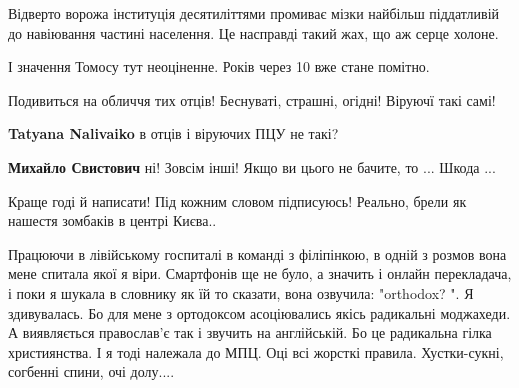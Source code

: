 \begin{itemize}
Відверто ворожа інституція десятиліттями промиває мізки найбільш піддатливій до
навіювання частині населення. Це насправді такий жах, що аж серце холоне.

І значення Томосу тут неоціненне. Років через 10 вже стане помітно.


 

Подивиться на обличчя тих отців!
Беснуваті, страшні, огідні!
Віруючї такі самі!

\begin{itemize}
 
\textbf{Tatyana Nalivaiko} в отців і віруючих ПЦУ не такі?

 
\textbf{Михайло Свистович} ні! Зовсім інші!
Якщо ви цього не бачите, то ...
Шкода ...
\end{itemize}

 
Краще годі й написати! Під кожним словом підписуюсь! Реально, брели як нашестя зомбаків в центрі Києва..

 
Працюючи в лівійському госпиталі в команді з філіпінкою, в одній з розмов вона мене спитала якої я віри.
Смартфонів ще не було, а значить і онлайн перекладача, і поки я шукала в словнику як їй то сказати, вона озвучила: "orthodox? ".
Я здивувалась. Бо для мене з ортодоксом асоціювались якісь радикальні моджахеди.
А виявляється православ'є так і звучить на англійській.
Бо це радикальна гілка християнства.
І я тоді належала до МПЦ.
Оці всі жорсткі правила. Хустки-сукні, согбенні спини, очі долу....


\end{itemize}

